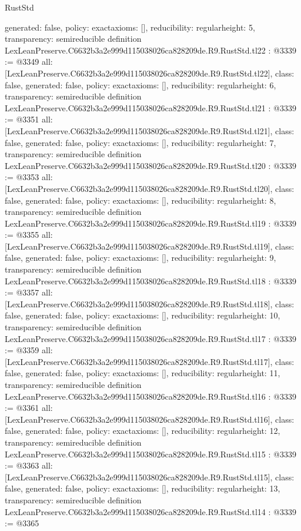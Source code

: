 \begin{lexlean}{RustStd}
\begin{coremodule}
{  generated: false,
  policy: exact{axioms: []},
  reducibility: regular{height: 5},
  transparency: semireducible
}
definition LexLeanPreserve.C6632b3a2e999d115038026ca828209de.R9.RustStd.tl22 : @3339 := @3349 {
  all: [LexLeanPreserve.C6632b3a2e999d115038026ca828209de.R9.RustStd.tl22],
  class: false,
  generated: false,
  policy: exact{axioms: []},
  reducibility: regular{height: 6},
  transparency: semireducible
}
definition LexLeanPreserve.C6632b3a2e999d115038026ca828209de.R9.RustStd.tl21 : @3339 := @3351 {
  all: [LexLeanPreserve.C6632b3a2e999d115038026ca828209de.R9.RustStd.tl21],
  class: false,
  generated: false,
  policy: exact{axioms: []},
  reducibility: regular{height: 7},
  transparency: semireducible
}
definition LexLeanPreserve.C6632b3a2e999d115038026ca828209de.R9.RustStd.tl20 : @3339 := @3353 {
  all: [LexLeanPreserve.C6632b3a2e999d115038026ca828209de.R9.RustStd.tl20],
  class: false,
  generated: false,
  policy: exact{axioms: []},
  reducibility: regular{height: 8},
  transparency: semireducible
}
definition LexLeanPreserve.C6632b3a2e999d115038026ca828209de.R9.RustStd.tl19 : @3339 := @3355 {
  all: [LexLeanPreserve.C6632b3a2e999d115038026ca828209de.R9.RustStd.tl19],
  class: false,
  generated: false,
  policy: exact{axioms: []},
  reducibility: regular{height: 9},
  transparency: semireducible
}
definition LexLeanPreserve.C6632b3a2e999d115038026ca828209de.R9.RustStd.tl18 : @3339 := @3357 {
  all: [LexLeanPreserve.C6632b3a2e999d115038026ca828209de.R9.RustStd.tl18],
  class: false,
  generated: false,
  policy: exact{axioms: []},
  reducibility: regular{height: 10},
  transparency: semireducible
}
definition LexLeanPreserve.C6632b3a2e999d115038026ca828209de.R9.RustStd.tl17 : @3339 := @3359 {
  all: [LexLeanPreserve.C6632b3a2e999d115038026ca828209de.R9.RustStd.tl17],
  class: false,
  generated: false,
  policy: exact{axioms: []},
  reducibility: regular{height: 11},
  transparency: semireducible
}
definition LexLeanPreserve.C6632b3a2e999d115038026ca828209de.R9.RustStd.tl16 : @3339 := @3361 {
  all: [LexLeanPreserve.C6632b3a2e999d115038026ca828209de.R9.RustStd.tl16],
  class: false,
  generated: false,
  policy: exact{axioms: []},
  reducibility: regular{height: 12},
  transparency: semireducible
}
definition LexLeanPreserve.C6632b3a2e999d115038026ca828209de.R9.RustStd.tl15 : @3339 := @3363 {
  all: [LexLeanPreserve.C6632b3a2e999d115038026ca828209de.R9.RustStd.tl15],
  class: false,
  generated: false,
  policy: exact{axioms: []},
  reducibility: regular{height: 13},
  transparency: semireducible
}
definition LexLeanPreserve.C6632b3a2e999d115038026ca828209de.R9.RustStd.tl14 : @3339 := @3365 {
}
\end{coremodule}
\end{lexlean}
